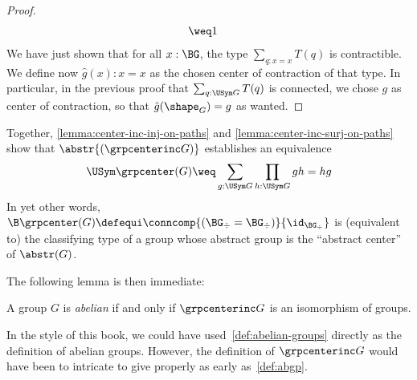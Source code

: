 \begin{proof}
\begin{displaymath}
\begin{aligned}
      &\weq 1
    \end{aligned}
  \end{displaymath}%
  We have just shown that for all $x:\BG$, the type
  $\sum_{q:x=x}T(q)$ is contractible. We define now $\hat g(x):x=x$ as
  the chosen center of contraction of that type. In particular, in the
  previous proof that $\sum_{q:\USym G}T(q)$ is connected, we
  chose $g$ as center of contraction, so that $\hat g (\shape_G) = g$ as
  wanted.
\end{proof}

Together, \cref{lemma:center-inc-inj-on-paths} and
\cref{lemma:center-inc-surj-on-paths} show that
$\abstr{(\grpcenterinc G)}$ establishes an equivalence
\begin{equation}
  \USym \grpcenter(G) \weq \sum_{g:\USym G}\prod_{h:\USym G}gh=hg
\end{equation}
In yet other words,
$\B \grpcenter(G)\defequi \conncomp{(\BG_\div = \BG_\div)}
{\id_{\BG_\div}}$ is (equivalent to) the classifying type of a
group whose abstract group is the ``abstract center'' of $\abstr(G)$.

The following lemma is then immediate:
\begin{lemma}
  \label{def:abelian-groups}%
  A group $G$ is {\em abelian} if and only if $\grpcenterinc G$ is an
  isomorphism of groups.
\end{lemma}

\begin{remark}
  In the style of this book, we could have
  used~\cref{def:abelian-groups} directly as the definition of abelian
  groups. However, the definition of $\grpcenterinc G$ would have been
  to intricate to give properly as early as~\cref{def:abgp}.
\end{remark}

